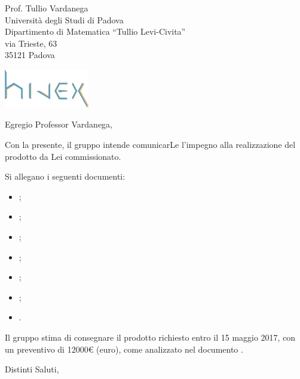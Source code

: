 \documentclass[a4paper]{letter} %
\begin{document}
\begin{letter}{
Prof. Tullio Vardanega\\
Università degli Studi di Padova\\
Dipartimento di Matematica “Tullio Levi-Civita”\\
via Trieste, 63\\
35121 Padova
}

\includegraphics[keepaspectratio=true,width=140px]{../../util/hivex_logo.png}

\opening{Egregio Professor Vardanega,}

Con la presente, il gruppo \hx{} intende comunicarLe l'impegno alla realizzazione del prodotto \proj{} da Lei commissionato.

Si allegano i seguenti documenti:%
\begin{itemize}
	\item \SdF;
	\item \NdP;
	\item \PdP;
	\item \PdQ;
	\item \AdR;
	\item \Glossario;
	\item \Verbali.
\end{itemize}

Il gruppo \hx{} stima di consegnare il prodotto richiesto entro il 15 maggio 2017, con un preventivo di 12000\euro{} (euro), come analizzato nel documento \PdP.

\closing{Distinti Saluti,}

\end{letter}
\end{document}
